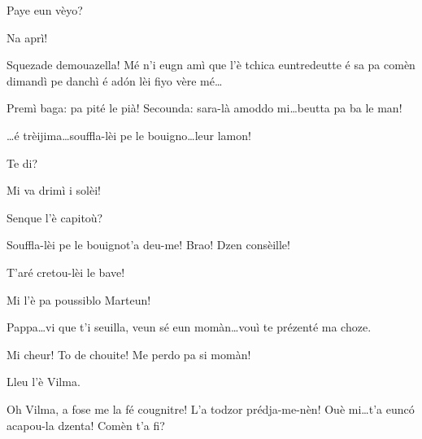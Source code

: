 \begin{drama}
\Dinospeaks Paye eun vèyo?

\Selmospeaks Na aprì!


\Selmospeaks{} Squezade demouazella! Mé n'i eugn amì que l'è tchica euntredeutte é sa pa comèn dimandì pe danchì é ad\'on lèi fiyo vère mé\ldots


\Selmospeaks Premì baga: pa pité le pià! Secounda: sara-là amoddo mi\ldots beutta pa ba le man!


\Selmospeaks{} \ldots é trèijima\ldots souffla-lèi pe le bouigno\ldots leur lamon!

\Marteunspeaks Te di?



\Ornellaspeaks{} Mi va drimì i solèi!


\Selmospeaks Senque l'è capitoù?

\Marteunspeaks \og Souffla-lèi pe le bouigno\fg t'a deu-me! Brao! Dzen con\-sè\-ille!

\Djouiyaoudouspeaks T'aré cretou-lèi le bave!

\Selmospeaks Mi l'è pa poussiblo Marteun!

\newpage
{}


\Giuliospeaks{} Pappa\ldots vi que t’i seuilla, veun sé eun momàn\ldots vouì te prézenté ma choze.

\Selmospeaks{} Mi cheur! To de chouite! Me perdo pa si momàn!


\Giuliospeaks Lleu l'è Vilma.

\Selmospeaks{} Oh Vilma, a fose me la fé cougnitre! L'a todzor prédja-me-nèn! Ouè mi\ldots t'a eunc\'o acapou-la dzenta! Comèn t'a fi?


\end{drama}
